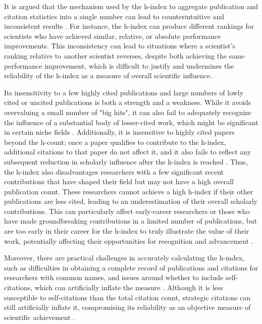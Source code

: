 It is argued that the mechanism used by the h-index to aggregate publication
and citation statistics into a single number can lead to counterintuitive and
inconsistent results \cite{waltman2012inconsistency}. For instance, the h-index
can produce different rankings for scientists who have achieved similar,
relative, or absolute performance improvements. This inconsistency can lead to
situations where a scientist’s ranking relative to another scientist reverses,
despite both achieving the same performance improvement, which is difficult to
justify and undermines the reliability of the h-index as a measure of overall
scientific influence.

Its insensitivity to a few highly cited publications and large numbers of lowly
cited or uncited publications is both a strength and a weakness. While it
avoids overvaluing a small number of "big hits", it can also fail to adequately
recognize the influence of a substantial body of lesser-cited work, which might
be significant in certain niche fields
\cite{hirsch2005index,costas2007h,waltman2012inconsistency,norris2010h,egghe2010hirsch}.
Additionally, it is insensitive to highly cited papers beyond the h-count; once
a paper qualifies to contribute to the h-index, additional citations to that
paper do not affect it, and it also fails to reflect any subsequent reduction
in scholarly influence after the h-index is reached
\cite{hirsch2005index,bornmann2007what,waltman2012inconsistency,norris2010h,egghe2010hirsch,hirsch2014meaning}.
Thus, the h-index also disadvantages researchers with a few significant recent
contributions that have shaped their field but may not have a high overall
publication count. These researchers cannot achieve a high h-index if their
other publications are less cited, leading to an underestimation of their
overall scholarly contributions. This can particularly affect early-career
researchers or those who have made groundbreaking contributions in a limited
number of publications, but are too early in their career for the h-index to
truly illustrate the value of their work, potentially affecting their
opportunities for recognition and advancement
\cite{hirsch2005index,bornmann2007what,costas2007h,waltman2012inconsistency,norris2010h,egghe2010hirsch,hirsch2014meaning}.

Moreover, there are practical challenges in accurately calculating the h-index,
such as difficulties in obtaining a complete record of publications and
citations for researchers with common names, and issues around whether to
include self-citations, which can artificially inflate the measure
\cite{costas2007h,norris2010h,bartneck2011detecting}. Although it is less
susceptible to self-citations than the total citation count, strategic
citations can still artificially inflate it, compromising its reliability as an
objective measure of scientific achievement
\cite{hirsch2005index,bornmann2007what,costas2007h,waltman2012inconsistency,norris2010h,egghe2010hirsch,hirsch2014meaning,bartneck2011detecting}.

